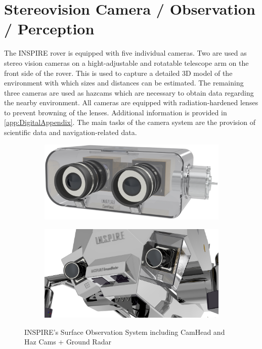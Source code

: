 \section{Stereovision Camera / Observation / Perception}

The INSPIRE rover is equipped with five individual cameras. Two are used as stereo vision cameras on a hight-adjustable and rotatable telescope arm on the front side of the rover. This is used to capture a detailed 3D model of the environment with which sizes and distances can be estimated. The remaining three cameras are used as hazcams which are necessary to obtain data regarding the nearby environment. All cameras are equipped with radiation-hardened lenses to prevent browning of the lenses. Additional information is provided in \autoref{app:DigitalAppendix}. The main tasks of the camera system are the provision of scientific data and navigation-related data. %

\begin{figure}[htb]
     \centering
     \begin{subfigure}[b]{0.45\textwidth}
         \centering
         \includegraphics[width=\textwidth]{Media/CamHead}
         \label{fig:CamHead}
     \end{subfigure}
     \hfill
     \begin{subfigure}[b]{0.45\textwidth}
         \centering
         \includegraphics[width=\textwidth]{Media/HazCam_GroundRadar}
         \label{fig:HazCam}
     \end{subfigure}
     \hfill
     \caption{INSPIRE's Surface Observation System including CamHead and Haz Cams + Ground Radar}
     \label{fig:Observation}
\end{figure}

